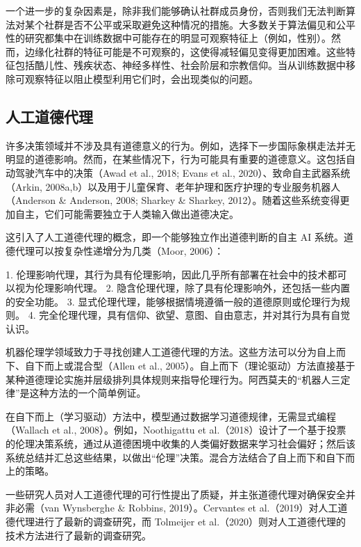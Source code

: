 \documentclass[lang=cn,newtx,10pt,scheme=chinese]{elegantbook}
\begin{document}

一个进一步的复杂因素是，除非我们能够确认社群成员身份，否则我们无法判断算法对某个社群是否不公平或采取避免这种情况的措施。大多数关于算法偏见和公平性的研究都集中在训练数据中可能存在的明显可观察特征上（例如，性别）。然而，边缘化社群的特征可能是不可观察的，这使得减轻偏见变得更加困难。这些特征包括酷儿性、残疾状态、神经多样性、社会阶层和宗教信仰。当从训练数据中移除可观察特征以阻止模型利用它们时，会出现类似的问题。

\subsection{人工道德代理}
许多决策领域并不涉及具有道德意义的行为。例如，选择下一步国际象棋走法并无明显的道德影响。然而，在某些情况下，行为可能具有重要的道德意义。这包括自动驾驶汽车中的决策（Awad et al., 2018; Evans et al., 2020）、致命自主武器系统（Arkin, 2008a,b）以及用于儿童保育、老年护理和医疗护理的专业服务机器人（Anderson \& Anderson, 2008; Sharkey \& Sharkey, 2012）。随着这些系统变得更加自主，它们可能需要独立于人类输入做出道德决定。

这引入了人工道德代理的概念，即一个能够独立作出道德判断的自主 AI 系统。道德代理可以按复杂性递增分为几类（Moor, 2006）：

1. 伦理影响代理，其行为具有伦理影响，因此几乎所有部署在社会中的技术都可以视为伦理影响代理。
2. 隐含伦理代理，除了具有伦理影响外，还包括一些内置的安全功能。
3. 显式伦理代理，能够根据情境遵循一般的道德原则或伦理行为规则。
4. 完全伦理代理，具有信仰、欲望、意图、自由意志，并对其行为具有自觉认识。

机器伦理学领域致力于寻找创建人工道德代理的方法。这些方法可以分为自上而下、自下而上或混合型（Allen et al., 2005）。自上而下（理论驱动）方法直接基于某种道德理论实施并层级排列具体规则来指导伦理行为。阿西莫夫的“机器人三定律”是这种方法的一个简单例证。

在自下而上（学习驱动）方法中，模型通过数据学习道德规律，无需显式编程（Wallach et al., 2008）。例如，Noothigattu et al.（2018）设计了一个基于投票的伦理决策系统，通过从道德困境中收集的人类偏好数据来学习社会偏好；然后该系统总结并汇总这些结果，以做出“伦理”决策。混合方法结合了自上而下和自下而上的策略。

一些研究人员对人工道德代理的可行性提出了质疑，并主张道德代理对确保安全并非必需（van Wynsberghe \& Robbins, 2019）。Cervantes et al.（2019）对人工道德代理进行了最新的调查研究，而 Tolmeijer et al.（2020）则对人工道德代理的技术方法进行了最新的调查研究。
\end{document}
